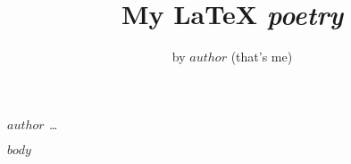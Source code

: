 \documentclass[titlepage]{octavo}
\title{My \LaTeX{} \emph{poetry}}
\author{by $author$ (that's me)}
\date{}
\begin{document}
\begin{titlepage}
\begin{center}
\vfill 

\Huge \fontsize{75}{60}\selectfont
{}
\vfill 
\large\emph{$author$ \ldots} 
\vfill  
\end{center}
\end{titlepage}

\curlyframe{\vspace{-8ex}\tableofcontents\vspace{8ex}}

$body$
\end{document}
